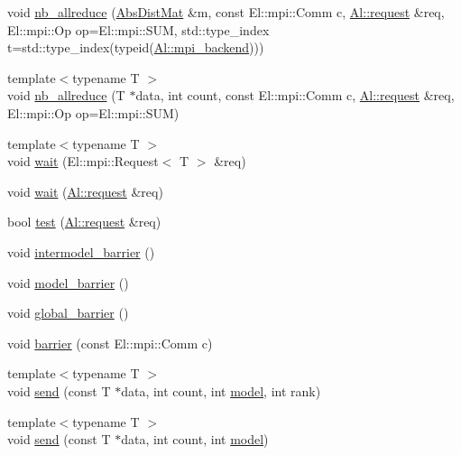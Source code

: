 \begin{DoxyCompactItemize}
\item 
void \hyperlink{classlbann_1_1lbann__comm_a2a7bb6cf3707366fc0671d8894ca30ea}{nb\+\_\+allreduce} (\hyperlink{base_8hpp_a9a697a504ae84010e7439ffec862b470}{Abs\+Dist\+Mat} \&m, const El\+::mpi\+::\+Comm c, \hyperlink{structlbann_1_1Al_1_1request}{Al\+::request} \&req, El\+::mpi\+::\+Op op=El\+::mpi\+::\+S\+UM, std\+::type\+\_\+index t=std\+::type\+\_\+index(typeid(\hyperlink{namespacelbann_1_1Al_a8a69c2fac7e1117883fff1903c2232ce}{Al\+::mpi\+\_\+backend})))
\item 
{\footnotesize template$<$typename T $>$ }\\void \hyperlink{classlbann_1_1lbann__comm_afb144a99e0cd2241f5fb05cad68b1f08}{nb\+\_\+allreduce} (T $\ast$data, int count, const El\+::mpi\+::\+Comm c, \hyperlink{structlbann_1_1Al_1_1request}{Al\+::request} \&req, El\+::mpi\+::\+Op op=El\+::mpi\+::\+S\+UM)
\item 
{\footnotesize template$<$typename T $>$ }\\void \hyperlink{classlbann_1_1lbann__comm_a30439f28cf615e1406090799c5499321}{wait} (El\+::mpi\+::\+Request$<$ T $>$ \&req)
\item 
void \hyperlink{classlbann_1_1lbann__comm_a91d09d595801f6228ee0aecf6dea25c7}{wait} (\hyperlink{structlbann_1_1Al_1_1request}{Al\+::request} \&req)
\item 
bool \hyperlink{classlbann_1_1lbann__comm_a99303a11b939b4aba9d4a67dd0deef56}{test} (\hyperlink{structlbann_1_1Al_1_1request}{Al\+::request} \&req)
\item 
void \hyperlink{classlbann_1_1lbann__comm_a5834e95e066313d9328b22e4a0ec8663}{intermodel\+\_\+barrier} ()
\item 
void \hyperlink{classlbann_1_1lbann__comm_a6086ced12c3eefeea6e2a78eff286983}{model\+\_\+barrier} ()
\item 
void \hyperlink{classlbann_1_1lbann__comm_ae12af95f4826571efa03fb8520260daa}{global\+\_\+barrier} ()
\item 
void \hyperlink{classlbann_1_1lbann__comm_a303c02c5a127f3ed21f12c9a71cc90a6}{barrier} (const El\+::mpi\+::\+Comm c)
\item 
{\footnotesize template$<$typename T $>$ }\\void \hyperlink{classlbann_1_1lbann__comm_a086078b881e7250df140ac116adb1939}{send} (const T $\ast$data, int count, int \hyperlink{classlbann_1_1model}{model}, int rank)
\item 
{\footnotesize template$<$typename T $>$ }\\void \hyperlink{classlbann_1_1lbann__comm_a12ddcc441fa1073aff23797c3c923ef6}{send} (const T $\ast$data, int count, int \hyperlink{classlbann_1_1model}{model})

\end{DoxyCompactItemize}
